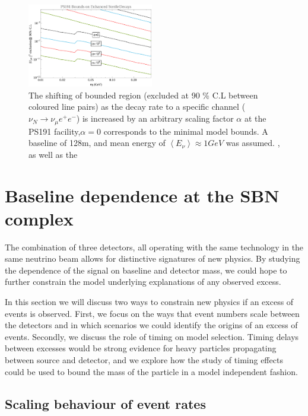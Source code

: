 \documentclass[11pt, a4paper]{article}
\begin{document}
 
\begin{figure}[t]
%
\centering
%
\includegraphics[width=0.49\textwidth]{figures/ps191_enhanced.pdf} 
%
\caption{\label{fig:ps191_enhance}The shifting of bounded region (excluded at
90 \% C.L  between coloured line pairs) as the decay rate to a specific channel
($\nu_N \rightarrow \nu_\mu e^+e^-$) is increased by an arbitrary scaling
factor $\alpha$ at the PS191 facility,$\alpha = 0$ corresponds to the minimal
model bounds. A baseline of 128m, and mean energy of $\left< E_\nu \right>
\approx 1 GeV$ was assumed.  , as well as the }
%
\end{figure}

\section{\label{sec:baselineinterplay}Baseline dependence at the SBN complex}

The combination of three detectors, all operating with the same technology in
the same neutrino beam allows for distinctive signatures of new physics. By
studying the dependence of the signal on baseline and detector mass, we could
hope to further constrain the model underlying explanations of any observed
excess.  

In this section we will discuss two ways to constrain new physics if an excess
of events is observed. First, we focus on the ways that event numbers scale
between the detectors and in which scenarios we could identify the origins of
an excess of events. Secondly, we discuss the role of timing on model selection.
Timing delays between excesses would be strong evidence for heavy particles 
propagating between source and detector, and we explore how the study of timing
effects could be used to bound the mass of the particle in a model independent 
fashion.

\subsection{Scaling behaviour of event rates}
\end{document}
